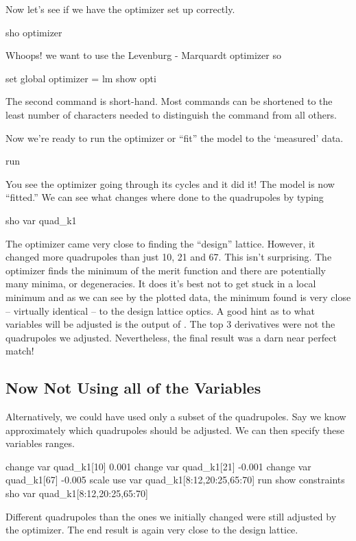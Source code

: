 Now let's see if we have the optimizer set up correctly.
\begin{example}
  sho optimizer
\end{example}
Whoops! we want to use the Levenburg - Marquardt optimizer so
\begin{example}
  set global optimizer = lm
  show opti
\end{example}
The second command is short-hand. Most \tao commands can be shortened
to the least number of characters needed to distinguish the command
from all others.

Now we're ready to run the optimizer or ``fit'' the model to the
`measured' data.
\begin{example}
  run
\end{example}
You see the optimizer going through its cycles and it did it! The
model is now ``fitted.'' We can see what changes where done to the
quadrupoles by typing
\begin{example}
  sho var quad\_k1
\end{example}
The optimizer came very close to finding the ``design''
lattice. However, it changed more quadrupoles than just 10, 21 and
67. This isn't surprising. The optimizer finds the minimum of the
merit function and there are potentially many minima, or
degeneracies.  It does it's best not to get stuck in a local minimum
and as we can see by the plotted data, the minimum found is very close
-- virtually identical -- to the design lattice optics.  A good hint
as to what variables will be adjusted is the output of .  The top 3 derivatives were not the quadrupoles we
adjusted. Nevertheless, the final result was a darn near perfect
match!

\subsection{Now Not Using all of the Variables}
\label{ss:fix_it_not_all}

Alternatively, we could have used only a subset of the
quadrupoles. Say we know approximately which quadrupoles should be
adjusted. We can then specify these variables ranges.
\begin{example}
  change var quad\_k1[10]   0.001
  change var quad\_k1[21]  -0.001
  change var quad\_k1[67]  -0.005
  scale
  use var quad\_k1[8:12,20:25,65:70]
  run
  show constraints
  sho var quad\_k1[8:12,20:25,65:70]
\end{example}
Different quadrupoles than the ones we initially changed were still
adjusted by the optimizer. The end result is again very close to the
design lattice.

